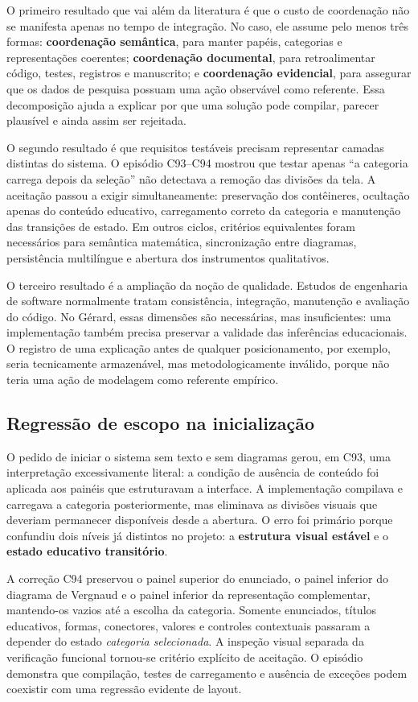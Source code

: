 \documentclass[preprint,12pt,authoryear]{elsarticle}
\newcommand{\gerard}{Gérard\xspace}
\begin{document}
O primeiro resultado que vai além da literatura é que o custo de coordenação não se manifesta apenas no tempo de integração. No caso, ele assume pelo menos três formas: \textbf{coordenação semântica}, para manter papéis, categorias e representações coerentes; \textbf{coordenação documental}, para retroalimentar código, testes, registros e manuscrito; e \textbf{coordenação evidencial}, para assegurar que os dados de pesquisa possuam uma ação observável como referente. Essa decomposição ajuda a explicar por que uma solução pode compilar, parecer plausível e ainda assim ser rejeitada.

O segundo resultado é que requisitos testáveis precisam representar camadas distintas do sistema. O episódio C93--C94 mostrou que testar apenas ``a categoria carrega depois da seleção'' não detectava a remoção das divisões da tela. A aceitação passou a exigir simultaneamente: preservação dos contêineres, ocultação apenas do conteúdo educativo, carregamento correto da categoria e manutenção das transições de estado. Em outros ciclos, critérios equivalentes foram necessários para semântica matemática, sincronização entre diagramas, persistência multilíngue e abertura dos instrumentos qualitativos.

O terceiro resultado é a ampliação da noção de qualidade. Estudos de engenharia de software normalmente tratam consistência, integração, manutenção e avaliação do código. No \gerard, essas dimensões são necessárias, mas insuficientes: uma implementação também precisa preservar a validade das inferências educacionais. O registro de uma explicação antes de qualquer posicionamento, por exemplo, seria tecnicamente armazenável, mas metodologicamente inválido, porque não teria uma ação de modelagem como referente empírico.

\subsection{Regressão de escopo na inicialização}
O pedido de iniciar o sistema sem texto e sem diagramas gerou, em C93, uma interpretação excessivamente literal: a condição de ausência de conteúdo foi aplicada aos painéis que estruturavam a interface. A implementação compilava e carregava a categoria posteriormente, mas eliminava as divisões visuais que deveriam permanecer disponíveis desde a abertura. O erro foi primário porque confundiu dois níveis já distintos no projeto: a \textbf{estrutura visual estável} e o \textbf{estado educativo transitório}.

A correção C94 preservou o painel superior do enunciado, o painel inferior do diagrama de Vergnaud e o painel inferior da representação complementar, mantendo-os vazios até a escolha da categoria. Somente enunciados, títulos educativos, formas, conectores, valores e controles contextuais passaram a depender do estado \emph{categoria selecionada}. A inspeção visual separada da verificação funcional tornou-se critério explícito de aceitação. O episódio demonstra que compilação, testes de carregamento e ausência de exceções podem coexistir com uma regressão evidente de layout.
\end{document}
